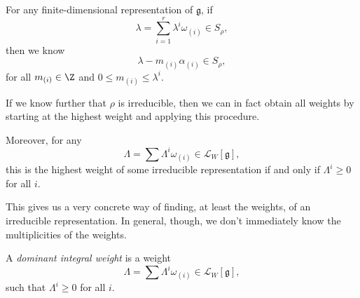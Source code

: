 \documentclass[a4paper]{article}
\begin{document}
\begin{thm}
  For any finite-dimensional representation of $\mathfrak{g}$, if
  \[
    \lambda = \sum_{i = 1}^r \lambda^i \omega_{(i)} \in S_\rho,
  \]
  then we know
  \[
    \lambda - m_{(i)} \alpha_{(i)} \in S_\rho,
  \]
  for all $m_{(i)} \in \Z$ and $0 \leq m_{(i)} \leq \lambda^i$.

  If we know further that $\rho$ is irreducible, then we can in fact obtain all weights by starting at the highest weight and applying this procedure.

  Moreover, for any
  \[
    \Lambda = \sum \Lambda^i \omega_{(i)} \in \mathcal{L}_W[\mathfrak{g}],
  \]
  this is the highest weight of some irreducible representation if and only if $\Lambda^i \geq 0$ for all $i$.
\end{thm}

This gives us a very concrete way of finding, at least the weights, of an irreducible representation. In general, though, we don't immediately know the multiplicities of the weights.

\begin{defi}
  A \emph{dominant integral weight} is a weight
  \[
    \Lambda = \sum \Lambda^i \omega_{(i)} \in \mathcal{L}_W[\mathfrak{g}],
  \]
  such that $\Lambda^i \geq 0$ for all $i$.
\end{defi}
\end{document}
